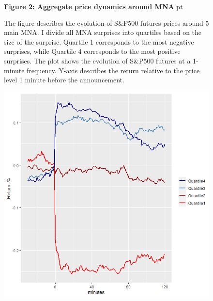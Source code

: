 \documentclass[12pt]{article}
\begin{document}
\begin{figure}[h!]
\textbf{Figure 2: Aggregate price dynamics around MNA}
 pt
\begin{flushleft}
{The figure describes the evolution of S\&P500 futures prices around 5 main MNA. I divide all MNA surprises into quartiles based on the size of the surprise. Quartile 1 corresponds to the most negative surprises, while Quartile 4 corresponds to the most positive surprises. The plot shows the evolution of S\&P500 futures at a 1-minute frequency. Y-axis describes the return relative to the price level 1 minute before the announcement. }
\end{flushleft}
\centering
\vspace{0.64cm}
\includegraphics[width=1\textwidth]{images/hf_response.png}
\end{figure}
\end{document}
